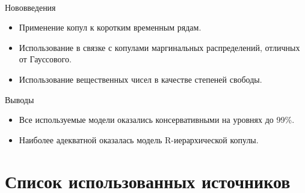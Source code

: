 \documentclass[aspectratio=169]{beamer}
\begin{document}
\begin{frame}{{}}
    \framesubtitle{\insertsection}
    \begin{block}{Нововведения}
        \begin{itemize}
            \item Применение копул к коротким временным рядам.
            \item Использование в связке с копулами маргинальных распределений, отличных от Гауссового.
            \item Использование вещественных чисел в качестве степеней свободы.
        \end{itemize}
    \end{block}
    \begin{block}{Выводы}
        \begin{itemize}
            \item Все используемые модели оказались консервативными на уровнях до 99\%.
            \item Наиболее адекватной оказалась модель R-иерархической копулы.
        \end{itemize}
    \end{block}
\end{frame}

\section{Список использованных источников}

    
\end{document}
